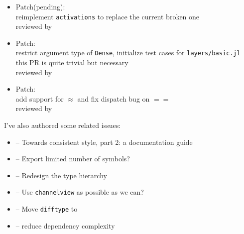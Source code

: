 \begin{itemize}
{      this PR serves as a first attempt to  -- Towards consistent style, part 2: a documentation guide\\
      not yet reviewed because the maintainers are busy lately
      }
    \item Patch(pending): \\
      {\small
      reimplement \texttt{activations} to replace the current broken one\\
      reviewed by \mikeinnes
      }
    \item Patch: \\
      {\small
      restrict argument type of \texttt{Dense}, initialize test cases for \texttt{layers/basic.jl}\\
      this PR is quite trivial but necessary\\
      reviewed by \mikeinnes
      }
    \item Patch: \\
      {\small
      add support for \textsf{$\approx$} and fix dispatch bug on \textsf{$==$} \\
      reviewed by \mikeinnes
      }
\end{itemize}
I've also authored some related issues:
\begin{itemize}
  \item {} -- Towards consistent style, part 2: a documentation guide
  \item {} -- Export limited number of symbols?
  \item {} -- Redesign the type hierarchy
  \item {} -- Use \texttt{channelview} as possible as we can?
  \item {} -- Move \texttt{difftype} to \imagecore
  \item {} -- reduce \images{} dependency complexity
\end{itemize}

